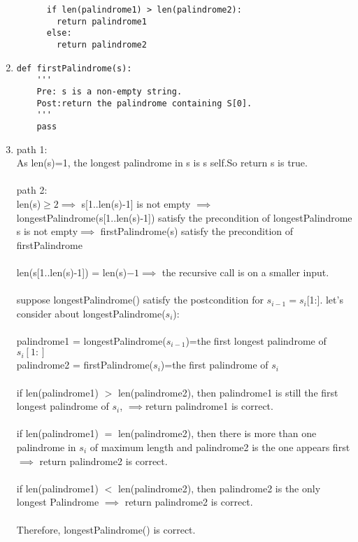 \documentclass[12pt]{article}
\begin{document}
\begin{enumerate}
\begin{small}
\begin{verbatim}
      if len(palindrome1) > len(palindrome2):
        return palindrome1
      else:
        return palindrome2
  \end{verbatim}
  \end{small}
\item
\begin{verbatim}
def firstPalindrome(s):
    '''
    Pre: s is a non-empty string.
    Post:return the palindrome containing S[0].
    '''
    pass
\end{verbatim}
\item
path 1:\\
As len(s)=1, the longest palindrome in s is s self.So return s is true.\\\\
path 2:\\
len(s)$\geq 2 \implies$ s[1..len(s)-1] is not empty $\implies$ longestPalindrome(s[1..len(s)-1]) satisfy the precondition of longestPalindrome\\
s is not empty$\implies$ firstPalindrome(s) satisfy the precondition of firstPalindrome\\\\
len(s[1..len(s)-1]) = len(s)$-1\implies$ the recursive call is on a smaller input.\\\\
suppose longestPalindrome() satisfy the postcondition for $s_{i-1}=s_{i}$[1:]. let's consider about longestPalindrome($s_{i}$):\\\\
palindrome1 = longestPalindrome($s_{i-1}$)=the first longest palindrome of $s_{i}[1:]$\\
palindrome2 = firstPalindrome($s_{i}$)=the first palindrome of $s_{i}$\\\\
if len(palindrome1) $>$ len(palindrome2), then palindrome1 is still the first longest palindrome of $s_{i}$, $\implies$return palindrome1 is correct.\\\\
if len(palindrome1) $=$ len(palindrome2), then there is more than one palindrome in $s_{i}$ of maximum length and palindrome2 is the one appears first $\implies$ return palindrome2 is correct.\\\\
if len(palindrome1) $<$ len(palindrome2), then palindrome2 is the only longest Palindrome $\implies$ return palindrome2 is correct.\\\\
Therefore, longestPalindrome() is correct.
\end{enumerate}
\end{document}
